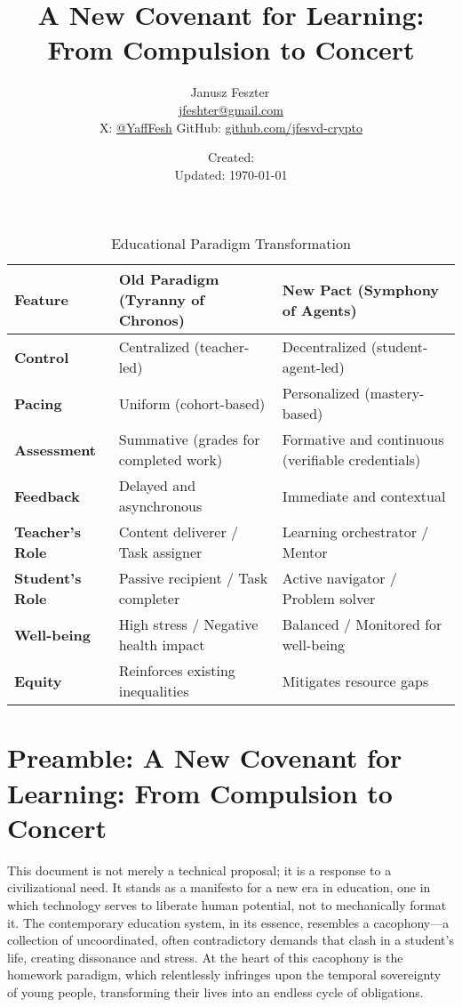 \documentclass[12pt,a4paper]{article}
\title{A New Covenant for Learning: From Compulsion to Concert}
\author{Janusz Feszter\,\orcidlink{0009-0002-1330-7530}\\
\small \href{mailto:jfeshter@gmail.com}{jfeshter@gmail.com}\\
\small X: \href{https://x.com/YaffFesh}{@YaffFesh} \quad
\small GitHub: \href{https://github.com/jfesvd-crypto}{github.com/jfesvd-crypto}
}
\date{Created: \createddate\\Updated: \today}
\begin{document}
\maketitle
\tableofcontents
\newpage

\begin{table}[htbp]
\centering
\caption{Educational Paradigm Transformation}
\label{tab:paradigm_shift}
\small
\begin{tabularx}{\textwidth}{@{}lXX@{}}
\toprule
\textbf{Feature} & \textbf{Old Paradigm (Tyranny of Chronos)} & \textbf{New Pact (Symphony of Agents)} \\
\midrule
\textbf{Control}    & Centralized (teacher-led)                 & Decentralized (student-agent-led) \\
\textbf{Pacing}     & Uniform (cohort-based)                    & Personalized (mastery-based) \\
\textbf{Assessment} & Summative (grades for completed work)     & Formative and continuous (verifiable credentials) \\
\textbf{Feedback}   & Delayed and asynchronous                  & Immediate and contextual \\
\textbf{Teacher's Role} & Content deliverer / Task assigner      & Learning orchestrator / Mentor \\
\textbf{Student's Role} & Passive recipient / Task completer     & Active navigator / Problem solver \\
\textbf{Well-being} & High stress / Negative health impact      & Balanced / Monitored for well-being \\
\textbf{Equity}     & Reinforces existing inequalities          & Mitigates resource gaps \\
\bottomrule
\end{tabularx}
\end{table}

\section*{Preamble: A New Covenant for Learning: From Compulsion to Concert}
This document is not merely a technical proposal; it is a response to a civilizational need. It stands as a manifesto for a new era in education, one in which technology serves to liberate human potential, not to mechanically format it. The contemporary education system, in its essence, resembles a cacophony---a collection of uncoordinated, often contradictory demands that clash in a student's life, creating dissonance and stress. At the heart of this cacophony is the homework paradigm, which relentlessly infringes upon the temporal sovereignty of young people, transforming their lives into an endless cycle of obligations.
\end{document}
